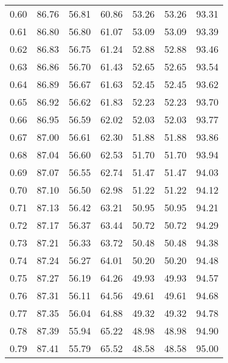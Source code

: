 \begin{tabular}{|c|c|c|c|c|c|c|}
      0.60 &     86.76 &     56.81 &      60.86 &   53.26 &      53.26 &         93.31 \\
      0.61 &     86.80 &     56.80 &      61.07 &   53.09 &      53.09 &         93.39 \\
      0.62 &     86.83 &     56.75 &      61.24 &   52.88 &      52.88 &         93.46 \\
      0.63 &     86.86 &     56.70 &      61.43 &   52.65 &      52.65 &         93.54 \\
      0.64 &     86.89 &     56.67 &      61.63 &   52.45 &      52.45 &         93.62 \\
      0.65 &     86.92 &     56.62 &      61.83 &   52.23 &      52.23 &         93.70 \\
      0.66 &     86.95 &     56.59 &      62.02 &   52.03 &      52.03 &         93.77 \\
      0.67 &     87.00 &     56.61 &      62.30 &   51.88 &      51.88 &         93.86 \\
      0.68 &     87.04 &     56.60 &      62.53 &   51.70 &      51.70 &         93.94 \\
      0.69 &     87.07 &     56.55 &      62.74 &   51.47 &      51.47 &         94.03 \\
      0.70 &     87.10 &     56.50 &      62.98 &   51.22 &      51.22 &         94.12 \\
      0.71 &     87.13 &     56.42 &      63.21 &   50.95 &      50.95 &         94.21 \\
      0.72 &     87.17 &     56.37 &      63.44 &   50.72 &      50.72 &         94.29 \\
      0.73 &     87.21 &     56.33 &      63.72 &   50.48 &      50.48 &         94.38 \\
      0.74 &     87.24 &     56.27 &      64.01 &   50.20 &      50.20 &         94.48 \\
      0.75 &     87.27 &     56.19 &      64.26 &   49.93 &      49.93 &         94.57 \\
      0.76 &     87.31 &     56.11 &      64.56 &   49.61 &      49.61 &         94.68 \\
      0.77 &     87.35 &     56.04 &      64.88 &   49.32 &      49.32 &         94.78 \\
      0.78 &     87.39 &     55.94 &      65.22 &   48.98 &      48.98 &         94.90 \\
      0.79 &     87.41 &     55.79 &      65.52 &   48.58 &      48.58 &         95.00 \\

\end{tabular}
